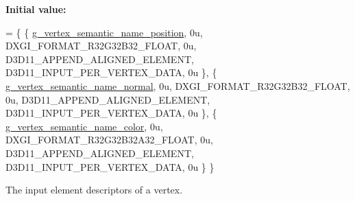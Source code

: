 {\bfseries Initial value\+:}
\begin{DoxyCode}
= \{
        \{ \hyperlink{namespacemage_1_1rendering_ae0a999915bd61d5a9d8addc04fe0646a}{g\_vertex\_semantic\_name\_position}, 0u, DXGI\_FORMAT\_R32G32B32\_FLOAT, 
         0u, D3D11\_APPEND\_ALIGNED\_ELEMENT, D3D11\_INPUT\_PER\_VERTEX\_DATA, 0u \},
        \{ \hyperlink{namespacemage_1_1rendering_aef3f964c7435c0b2009c7c5390ee3234}{g\_vertex\_semantic\_name\_normal},   0u, DXGI\_FORMAT\_R32G32B32\_FLOAT,   
       0u, D3D11\_APPEND\_ALIGNED\_ELEMENT, D3D11\_INPUT\_PER\_VERTEX\_DATA, 0u \},
        \{ \hyperlink{namespacemage_1_1rendering_a30c6185c03e23c5719a43ac9120d6f90}{g\_vertex\_semantic\_name\_color},    0u, DXGI\_FORMAT\_R32G32B32A32\_FLOAT, 
      0u, D3D11\_APPEND\_ALIGNED\_ELEMENT, D3D11\_INPUT\_PER\_VERTEX\_DATA, 0u \}
    \}
\end{DoxyCode}
The input element descriptors of a vertex. 